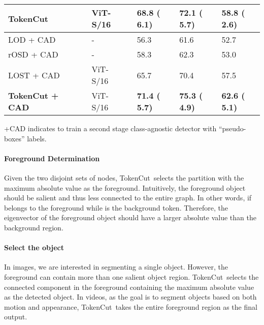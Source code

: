 \documentclass[twocolumn]{article}
\newcommand{\name} {TokenCut}
\newcommand{\cmark}{\ding{51}}\newcommand{\xmark}{\ding{55}}\newcommand\Tstrut{\rule{0pt}{2.6ex}}
\begin{document}
\begin{table*}[!t]
\begin{center}
{\begin{tabular}{lcllll}
    \bf TokenCut &  &  ViT-S/16~\cite{dosovitskiy2020image} & \bf 68.8 (\textcolor{cssgreen}{ \bf 6.1}) &  \bf 72.1 (\textcolor{cssgreen}{ \bf 5.7}) &  \bf 58.8 (\textcolor{cssgreen}{ \bf 2.6})\\ 
    \midrule
    LOD + CAD~\cite{simeoni2021localizing} & \cmark & -& 56.3 & 61.6 & 52.7 \\
    rOSD + CAD~\cite{simeoni2021localizing} & \cmark & -& 58.3 & 62.3 & 53.0 \\
    LOST + CAD~\cite{simeoni2021localizing} &  & ViT-S/16~\cite{dosovitskiy2020image}& 65.7 & 70.4 & 57.5 \\
    \bf TokenCut + CAD~\cite{simeoni2021localizing} &  & ViT-S/16~\cite{dosovitskiy2020image}& \bf 71.4 (\textcolor{cssgreen}{ \bf 5.7}) & \bf 75.3 (\textcolor{cssgreen}{ \bf 4.9})&  \bf 62.6 (\textcolor{cssgreen}{ \bf 5.1}) \\
\bottomrule
\end{tabular}}
\end{center}
\begin{center}
\vspace{1pt}
  \footnotesize{ +CAD indicates to train a second stage class-agnostic detector with ``pseudo-boxes'' labels.} 
\end{center}

\end{table*}


\paragraph*{Foreground Determination}
Given the two disjoint sets of nodes, \name~selects the partition with the maximum absolute value  as the foreground. 
Intuitively, the foreground object should be salient and thus less connected to the entire graph. In other words,  if  belongs to the foreground while  is the background token. Therefore, the eigenvector of the foreground object should have a larger absolute value than the  background region. 

\paragraph*{Select the object}
In images, we are interested in segmenting a single object. However,  the foreground can contain more than one salient object region. \name~selects the connected component in the foreground containing the maximum absolute value  as the detected object. In videos, as the goal is to segment objects based on both motion and appearance, \name~takes the entire foreground region as the final output. 
\end{document}
